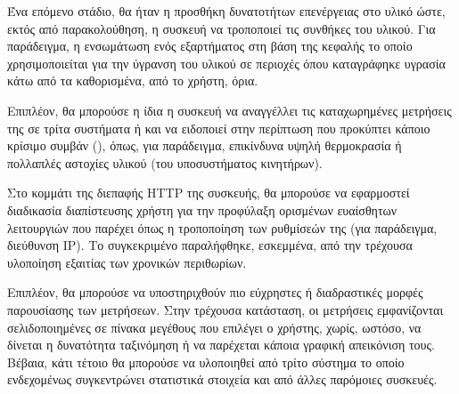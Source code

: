 Ένα επόμενο στάδιο, θα ήταν η προσθήκη δυνατοτήτων επενέργειας στο υλικό ώστε,
εκτός από παρακολούθηση, η συσκευή να τροποποιεί τις συνθήκες του υλικού. Για
παράδειγμα, η ενσωμάτωση ενός εξαρτήματος στη βάση της κεφαλής το οποίο
χρησιμοποιείται για την ύγρανση του υλικού σε περιοχές όπου καταγράφηκε υγρασία
κάτω από τα καθορισμένα, από το χρήστη, όρια.

Επιπλέον, θα μπορούσε η ίδια η συσκευή να αναγγέλλει τις καταχωρημένες μετρήσεις
της σε τρίτα συστήματα ή και να ειδοποιεί στην περίπτωση που προκύπτει κάποιο
κρίσιμο συμβάν (), όπως, για παράδειγμα, επικίνδυνα υψηλή θερμοκρασία
ή πολλαπλές αστοχίες υλικού (του υποσυστήματος κινητήρων).

Στο κομμάτι της διεπαφής HTTP της συσκευής, θα μπορούσε να εφαρμοστεί διαδικασία
διαπίστευσης χρήστη για την προφύλαξη ορισμένων ευαίσθητων λειτουργιών που
παρέχει όπως η τροποποίηση των ρυθμίσεών της (για παράδειγμα, διεύθυνση IP). Το
συγκεκριμένο παραλήφθηκε, εσκεμμένα, από την τρέχουσα υλοποίηση εξαιτίας των
χρονικών περιθωρίων.

Επιπλέον, θα μπορούσε να υποστηριχθούν πιο εύχρηστες ή διαδραστικές μορφές
παρουσίασης των μετρήσεων. Στην τρέχουσα κατάσταση, οι μετρήσεις εμφανίζονται
σελιδοποιημένες σε πίνακα μεγέθους που επιλέγει ο χρήστης, χωρίς, ωστόσο, να
δίνεται η δυνατότητα ταξινόμηση ή να παρέχεται κάποια γραφική απεικόνιση τους.
Βέβαια, κάτι τέτοιο θα μπορούσε να υλοποιηθεί από τρίτο σύστημα το οποίο
ενδεχομένως συγκεντρώνει στατιστικά στοιχεία και από άλλες παρόμοιες συσκευές.




